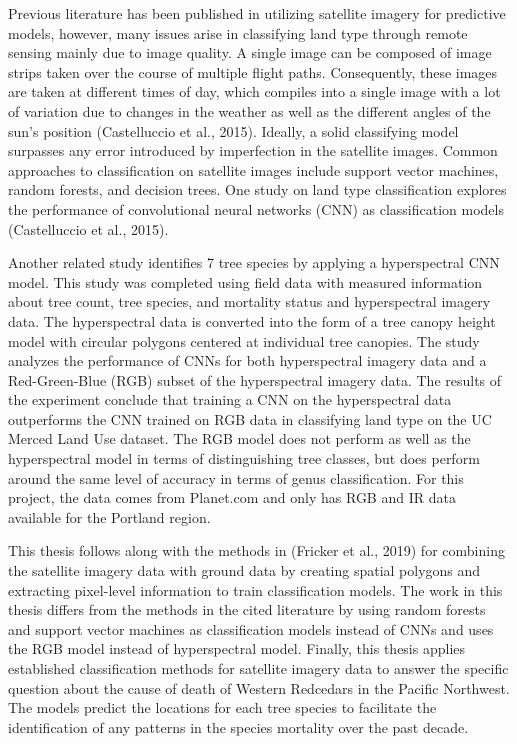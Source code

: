 \documentclass[12pt,twoside]{reedthesis}
\begin{document}
Previous literature has been published in utilizing satellite imagery for predictive models, however, many issues arise in classifying land type through remote sensing mainly due to image quality. A single image can be composed of image strips taken over the course of multiple flight paths. Consequently, these images are taken at different times of day, which compiles into a single image with a lot of variation due to changes in the weather as well as the different angles of the sun's position (Castelluccio et al., 2015). Ideally, a solid classifying model surpasses any error introduced by imperfection in the satellite images. Common approaches to classification on satellite images include support vector machines, random forests, and decision trees. One study on land type classification explores the performance of convolutional neural networks (CNN) as classification models (Castelluccio et al., 2015).

Another related study identifies 7 tree species by applying a hyperspectral CNN model. This study was completed using field data with measured information about tree count, tree species, and mortality status and hyperspectral imagery data. The hyperspectral data is converted into the form of a tree canopy height model with circular polygons centered at individual tree canopies. The study analyzes the performance of CNNs for both hyperspectral imagery data and a Red-Green-Blue (RGB) subset of the hyperspectral imagery data. The results of the experiment conclude that training a CNN on the hyperspectral data outperforms the CNN trained on RGB data in classifying land type on the UC Merced Land Use dataset. The RGB model does not perform as well as the hyperspectral model in terms of distinguishing tree classes, but does perform around the same level of accuracy in terms of genus classification. For this project, the data comes from Planet.com and only has RGB and IR data available for the Portland region.

This thesis follows along with the methods in (Fricker et al., 2019) for combining the satellite imagery data with ground data by creating spatial polygons and extracting pixel-level information to train classification models. The work in this thesis differs from the methods in the cited literature by using random forests and support vector machines as classification models instead of CNNs and uses the RGB model instead of hyperspectral model. Finally, this thesis applies established classification methods for satellite imagery data to answer the specific question about the cause of death of Western Redcedars in the Pacific Northwest. The models predict the locations for each tree species to facilitate the identification of any patterns in the species mortality over the past decade.
\end{document}
